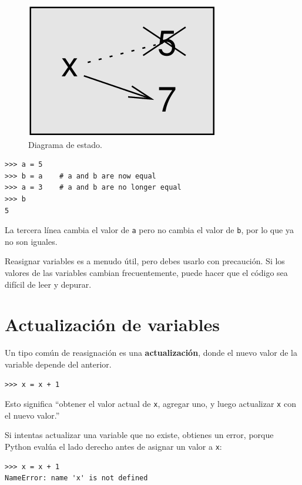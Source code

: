 \begin{figure}[h]
\centering
\includegraphics[width=0.7\linewidth]{images/chapter_7_1.png} %
\caption{Diagrama de estado.}
\label{fig:diagrama_estado}
\end{figure}

\begin{lstlisting}
>>> a = 5
>>> b = a    # a and b are now equal
>>> a = 3    # a and b are no longer equal
>>> b
5
\end{lstlisting}

La tercera línea cambia el valor de \texttt{a} pero no cambia el valor de \texttt{b}, por lo que ya no son iguales.

Reasignar variables es a menudo útil, pero debes usarlo con precaución. Si los valores de las variables cambian frecuentemente, puede hacer que el código sea difícil de leer y depurar.

\section{Actualización de variables}

Un tipo común de reasignación es una \textbf{actualización}, donde el nuevo valor de la variable depende del anterior.

\begin{lstlisting}
>>> x = x + 1
\end{lstlisting}

Esto significa ``obtener el valor actual de \texttt{x}, agregar uno, y luego actualizar \texttt{x} con el nuevo valor.''

Si intentas actualizar una variable que no existe, obtienes un error, porque Python evalúa el lado derecho antes de asignar un valor a \texttt{x}:

\begin{lstlisting}
>>> x = x + 1
NameError: name 'x' is not defined
\end{lstlisting}

